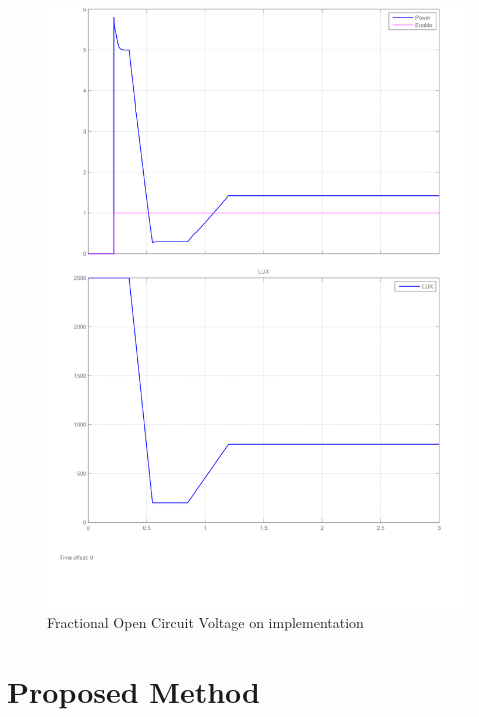 \begin{figure}[H]
	  \begin{center}
		  \includegraphics[width=\textwidth]{images/MATLAB_output_test-1}
		  \caption{ Fractional Open Circuit Voltage on implementation}
		  \label{fig:Frac_oc_result}
	  \end{center}
  \end{figure}
\section{Proposed Method }



